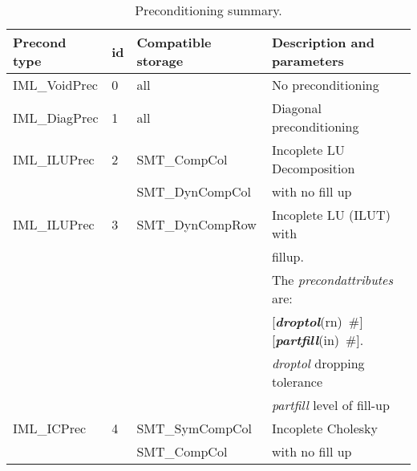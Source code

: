 \documentclass[draft]{article}
\newcommand{\param}[1]{{\em #1}}
\newcommand{\keywordnotype}[1]{\mbox{{\it{\bf{#1}}}}}
\newcommand{\keyword}[2]{\mbox{{\keywordnotype{#1}\tiny (#2)}}}
\newcommand{\field}[2]{\mbox{\keyword{#1}{#2}~\#}}
\newcommand{\optField}[2]{\mbox{[\field{#1}{#2}]}}
\begin{document}
\begin{table}[h]                                                                
\begin{center}                                                                  
\begin{tabular}{|l|l|l|l|}                                                      
\hline                                                                          
Precond type & id & Compatible storage & Description and parameters \\
\hline\hline
IML\_VoidPrec &0& all & No preconditioning\\
\hline
IML\_DiagPrec &1& all & Diagonal preconditioning\\
\hline
IML\_ILUPrec  &2& SMT\_CompCol & Incoplete LU Decomposition\\
              & & SMT\_DynCompCol&with no fill up\\
\hline
IML\_ILUPrec  &3& SMT\_DynCompRow & Incoplete LU (ILUT) with\\
              & &                 &  fillup. \\
              & &                 & The \param{precondattributes} are:\\
              & &                 & \optField{droptol}{rn}
\optField{partfill}{in}.\\
              & &                 & \param{droptol} dropping
tolerance\\
              & &                 & \param{partfill} level of
fill-up\\
\hline
IML\_ICPrec   &4& SMT\_SymCompCol&Incoplete Cholesky\\
              & & SMT\_CompCol   &with no fill up\\
\hline
\end{tabular}                                                                   
\caption{Preconditioning summary.}                
\label{precondtable}                                                         
\end{center}                                                                    
\end{table}                                                                     

%
\end{document}
